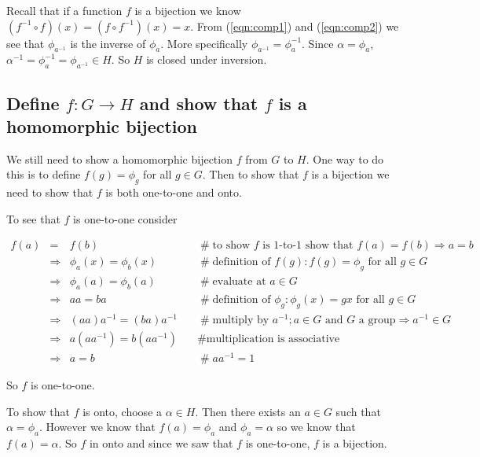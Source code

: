\documentclass{article}
\theoremstyle{definition}
\begin{document}
\bigskip
\noindent
Recall that if a function $f$ is a bijection we know $(f^{-1}
\circ f)(x) = (f \circ f^{-1})(x) = x$.  From (\ref{eqn:comp1})
and (\ref{eqn:comp2}) we see that $\phi_{a^{-1}}$ is the inverse
of $\phi_a$. More specifically $\phi_{a^{-1}} = \phi^{-1}_{a}$.
Since $\alpha = \phi_a$, $\alpha^{-1} = \phi^{-1}_a =
\phi_{a^{-1}} \in H$. So $H$ is closed under inversion.



\subsection{Define $f:G \rightarrow H$ and show that $f$ is a homomorphic bijection}
We still need to show a homomorphic bijection $f$ from $G$ to
$H$. One way to do this is to define $f(g) = \phi_{g}$ for all $g
\in G$.  Then to show that $f$ is a bijection we need to show
that $f$ is both one-to-one and onto.

\bigskip
\noindent
To see that $f$ is one-to-one consider

\begin{equation*}
\begin{array}{rcll}
f(a)
&=& f(b)                                &\quad  \mathrel{\#} \text{to show $f$ is 1-to-1 show that } f(a) = f(b) \Rightarrow a = b \\
&\Rightarrow& \phi_a(x) = \phi_b(x)     &\quad  \mathrel{\#} \text{definition of $f(g): f(g) = \phi_g \text{ for all } g \in G$} \\
&\Rightarrow& \phi_a(a) = \phi_b(a)     &\quad  \mathrel{\#} \text{evaluate at $a \in G$} \\
&\Rightarrow& aa = ba                   &\quad  \mathrel{\#} \text{definition of $\phi_{g}: \phi_{g}(x) = gx  \text{ for all } g \in G$} \\
&\Rightarrow& (aa)a^{-1} = (ba)a^{-1}   &\quad  \mathrel{\#} \text{multiply by $a^{-1}$}; a \in G \text{ and $G$ a group} \Rightarrow a^{-1} \in G \\
&\Rightarrow& a(aa^{-1}) = b(aa^{-1})   &\quad  \mathrel{\#} \text{multiplication is associative} \\
&\Rightarrow& a = b                     &\quad  \mathrel{\#} aa^{-1} = 1 
\end{array}
\end{equation*}

\bigskip
\noindent
So $f$ is one-to-one. 

\bigskip
\noindent
To show that $f$ is onto, choose a $\alpha \in H$. Then there
exists an $a \in G$ such that $\alpha = \phi_a$. However we know
that $f(a) = \phi_a$ and $\phi_a = \alpha$ so we know that $f(a)
= \alpha$. So $f$ in onto and since we saw that $f$ is
one-to-one, $f$ is a bijection.
\end{document}
